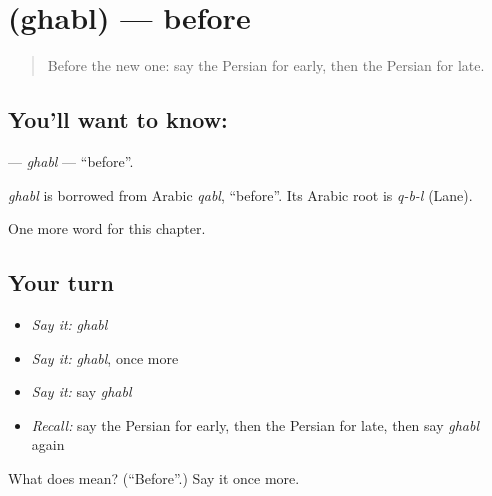 \section[\texorpdfstring{\fa{قبل} (ghabl)}{قبل (ghabl)}]{ (ghabl) — before}

\label{lesson:FA-C66-ghabl}



\begin{quote}
Before the new one: say the Persian for early, then the Persian for late.
\end{quote}

\subsection*{You'll want to know: }
\textbf{} — \emph{ghabl} — \textquotedblleft{}before\textquotedblright{}.

\begin{cousinweb}
\emph{ghabl} is borrowed from Arabic \emph{qabl}, \textquotedblleft{}before\textquotedblright{}. Its Arabic root is \emph{q-b-l} (Lane).
\end{cousinweb}

\begin{grammarlens}[title={What you've built}]
One more word for this chapter.
\end{grammarlens}

\subsection*{Your turn}
\begin{itemize}
\raggedright
  \item \emph{Say it:} \emph{ghabl}
  \item \emph{Say it:} \emph{ghabl}, once more
  \item \emph{Say it:} say \emph{ghabl}
  \item \emph{Recall:} say the Persian for early, then the Persian for late, then say \emph{ghabl} again
\end{itemize}

\begin{tcolorbox}[breakable,colback=teal!4,colframe=teal!35!black,title={Before you move on}]
What does  mean? (\textquotedblleft{}Before\textquotedblright{}.) Say it once more.
\end{tcolorbox}
